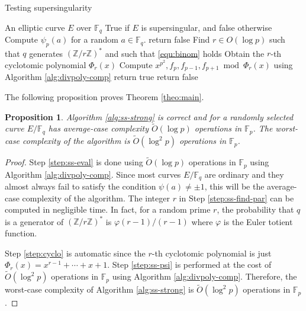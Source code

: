 \documentclass[12pt]{article}
\theoremstyle{plain}
\newtheorem{proposition}[theorem]{Proposition}
\theoremstyle{definition}
\newcommand{\tildO}{\tilde{O}}
\def\Z{\ensuremath{\mathbb{Z}}}
\def\F{\ensuremath{\mathbb{F}}}
\begin{document}
\begin{algorithm}[H]
	\caption{Testing supersingularity}
	\label{alg:ss-strong}
	\begin{algorithmic}[1]
		\REQUIRE An elliptic curve $E$ over $\F_q$
		\ENSURE True if $E$ is supersingular, and false otherwise
		\STATE\label{step:ss-eval}
		Compute $\psi_p(a)$ for a random $a \in \F_q$.
			\STATE return false
		\ENDIF
		\STATE\label{step:ss-find-par}
		Find $r \in O(\log p)$ such that $q$ generates $(\Z/r\Z)^*$ and such that \eqref{equ:binom} 
		holds
		\STATE\label{step:cyclo}
		Obtain the $r$-th cyclotomic polynomial $\Phi_r(x)$
		\STATE\label{step:ss-psi}
		Compute $x^{p^2}, f_p, f_{p - 1}, f_{p + 1} \bmod \Phi_r(x)$ using Algorithm 
		\ref{alg:divpoly-comp}
			\STATE return true
		\ELSE
			\STATE return false
		\ENDIF
	\end{algorithmic}
\end{algorithm}
The following proposition proves Theorem \ref{theo:main}.
\begin{proposition}
	\label{prop:ss-strong}
	Algorithm \ref{alg:ss-strong} is correct and for a randomly selected curve $E/\F_q$ has 
	average-case complexity $\tildO(\log p)$ operations in $\F_p$. The worst-case complexity of the 
	algorithm is $\tildO(\log^2 p)$ operations in $\F_p$.
\end{proposition}
\begin{proof}
	Step \ref{step:ss-eval} is done using $\tildO(\log p)$ operations in $\F_p$ using Algorithm 
	\ref{alg:divpoly-comp}. Since most curves $E/\F_q$ are ordinary and they almost always fail to 
	satisfy the condition $\psi(a) \ne \pm 1$, this will be the average-case complexity of the 
	algorithm. The integer $r$ in Step \ref{step:ss-find-par} can be computed in negligible time. 
	In fact, for a random prime $r$, the probability that $q$ is a generator of $(\Z/r\Z)^*$ is
	$\varphi(r - 1) / (r - 1)$ where $\varphi$ is the Euler totient function.
	
	Step \ref{step:cyclo} is automatic since the $r$-th cyclotomic polynomial is just $\Phi_r(x) = 
	x^{r - 1} + \cdots + x + 1$. Step \ref{step:ss-psi} is performed at the cost of $\tildO(\log^2 
	p)$ operations in $\F_p$ using Algorithm \ref{alg:divpoly-comp}. Therefore, the worst-case 
	complexity of Algorithm \ref{alg:ss-strong} is $\tildO(\log^2 p)$ operations in 
	$\F_p$.
\end{proof}
\end{document}
